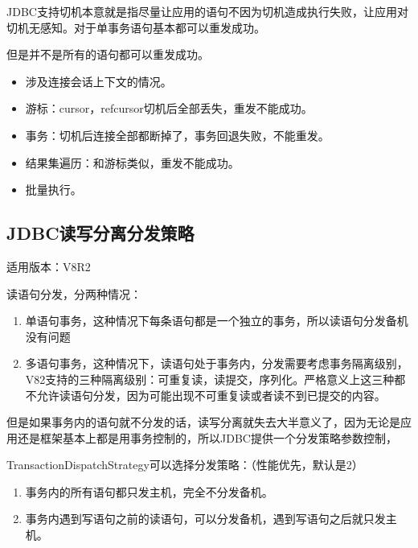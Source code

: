 \documentclass[a4,10pt,oneside,english]{sphinxmanual}
\begin{document}
JDBC支持切机本意就是指尽量让应用的语句不因为切机造成执行失败，让应用对切机无感知。对于单事务语句基本都可以重发成功。

但是并不是所有的语句都可以重发成功。
\begin{itemize}
\item {} 
涉及连接会话上下文的情况。

\item {} 
游标：cursor，refcursor切机后全部丢失，重发不能成功。

\item {} 
事务：切机后连接全部都断掉了，事务回退失败，不能重发。

\item {} 
结果集遍历：和游标类似，重发不能成功。

\item {} 
批量执行。

\end{itemize}


\subsection{JDBC读写分离分发策略}
\label{\detokenize{interface/jdbc:id9}}
适用版本：V8R2

读语句分发，分两种情况：
\begin{enumerate}
%
\item {} 
单语句事务，这种情况下每条语句都是一个独立的事务，所以读语句分发备机没有问题

\item {} 
多语句事务，这种情况下，读语句处于事务内，分发需要考虑事务隔离级别，V82支持的三种隔离级别：可重复读，读提交，序列化。严格意义上这三种都不允许读语句分发，因为可能出现不可重复读或者读不到已提交的内容。

\end{enumerate}

但是如果事务内的语句就不分发的话，读写分离就失去大半意义了，因为无论是应用还是框架基本上都是用事务控制的，所以JDBC提供一个分发策略参数控制，

TransactionDispatchStrategy可以选择分发策略：（性能优先，默认是2）
\begin{enumerate}
%
\item {} 
事务内的所有语句都只发主机，完全不分发备机。

\item {} 
事务内遇到写语句之前的读语句，可以分发备机，遇到写语句之后就只发主机。

\end{enumerate}
\end{document}
